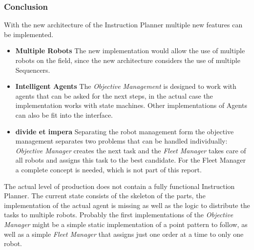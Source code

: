 \subsubsection{Conclusion}
With the new architecture of the Instruction Planner multiple new features can be implemented.
\begin{itemize}
    \item \textbf{Multiple Robots} The new implementation would allow the use of multiple robots on the field, since
    the new architecture considers the use of multiple Sequencers.
    \item \textbf{Intelligent Agents} The \textit{Objective Management} is designed to work with agents that can be asked
    for the next steps, in the actual case the implementation works with state machines. Other implementations of Agents can
    also be fit into the interface.
    \item \textbf{divide et impera} Separating the robot management form the objective management separates two problems
    that can be handled individually: \textit{Objective Manager} creates the next task and the \textit{Fleet Manager} takes care
    of all robots and assigns this task to the best candidate. For the Fleet Manager a complete concept is needed, which is not part of this report.
\end{itemize}

The actual level of production does not contain a fully functional Instruction Planner.
The current state consists of the skeleton of the parts, the implementation of the
actual agent is missing as well as the logic to distribute the tasks to multiple robots.
Probably the first implementations of the \textit{Objective Manager} might be a
simple static implementation of a point pattern to follow, as well as a simple \textit{Fleet Manager} that
assigns just one order at a time to only one robot.

\newpage
